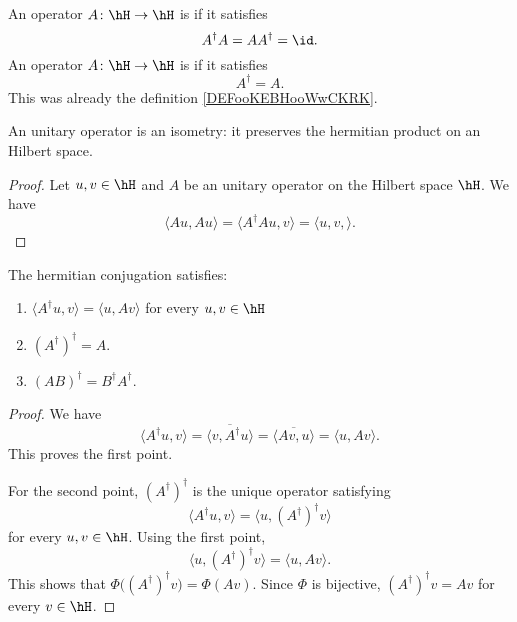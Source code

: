 \begin{definition}      \label{DEFooOKGXooFCzCHu}
    An operator \( A\colon \hH\to \hH\) is  if it satisfies
    \begin{equation}
        A^{\dag}A=AA^{\dag}=\id.
    \end{equation}
    An operator \( A\colon \hH\to \hH\) is  if it satisfies
    \begin{equation}
        A^{\dag}=A.
    \end{equation}
    This was already the definition \ref{DEFooKEBHooWwCKRK}.
\end{definition}

\begin{lemma}
    An unitary operator is an isometry: it preserves the hermitian product on an Hilbert space.
\end{lemma}

\begin{proof}
    Let \( u,v\in \hH\) and \( A\) be an unitary operator on the Hilbert space \( \hH\). We have
    \begin{equation}
        \langle Au, Au\rangle =\langle A^{\dag}Au, v\rangle =\langle u,v, \rangle .
    \end{equation}
\end{proof}

\begin{lemma}        \label{LEMooJYGRooPTMZwY}
    The hermitian conjugation satisfies:
    \begin{enumerate}
        \item
            \( \langle A^{\dag}u, v\rangle =\langle u, Av\rangle \) for every \( u,v\in \hH\)
        \item
            \( (A^{\dag})^{\dag}=A\).
        \item
            \( (AB)^{\dag}=B^{\dag}A^{\dag}\).
    \end{enumerate}
\end{lemma}

\begin{proof}
    We have
    \begin{equation}
        \langle A^{\dag}u, v\rangle =\overline{ \langle v, A^{\dag}u\rangle  }=\overline{ \langle Av, u\rangle  }=\langle u, Av\rangle .
    \end{equation}
    This proves the first point.

    For the second point, \( (A^{\dag})^{\dag}\) is the unique operator satisfying
    \begin{equation}
        \langle A^{\dag}u, v\rangle =\langle u, (A^{\dag})^{\dag}v\rangle 
    \end{equation}
    for every \( u,v\in \hH\). Using the first point,
    \begin{equation}
        \langle u, (A^{\dag})^{\dag} v\rangle =\langle u, Av\rangle .
    \end{equation}
    This shows that \( \Phi\big( (A^{\dag})^{\dag}v \big)=\Phi(Av)\). Since \( \Phi\) is bijective, \( (A^{\dag})^{\dag}v=Av\) for every \( v\in \hH\).
\end{proof}

